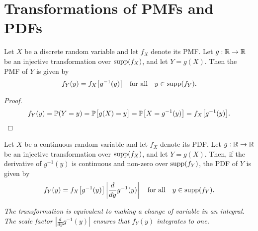 \section{Transformations of PMFs and PDFs}

\begin{theorem}\label{thm:transf_injective_discrete}
Let $X$ be a discrete random variable and let $f_X$ denote its PMF.  Let $g:\mathbb{R}\to\mathbb{R}$ be an injective transformation over $\text{supp}(f_X)$, and let $Y=g(X)$. Then the PMF of $Y$ is given by
\[
f_Y(y) = f_X\big[g^{-1}(y)\big] 
	\quad\text{for all}\quad y\in \supp(f_Y).%
\]
\end{theorem}

\begin{proof}
\[
f_Y(y)
	= \mathbb{P}(Y=y)
	= \mathbb{P}\big[g(X) = y\big]
	= \mathbb{P}\big[X = g^{-1}(y)\big]
	= f_X\big[g^{-1}(y)\big].
\]
\end{proof}	


\begin{theorem}\label{thm:transf_injective_continuous}
Let $X$ be a continuous random variable and let $f_X$ denote its PDF. Let $g:\mathbb{R}\to\mathbb{R}$ be an injective transformation over $\text{supp}(f_X)$, and let $Y=g(X)$. Then, if the derivative of $g^{-1}(y)$ is continuous and non-zero over $\text{supp}(f_Y)$, the PDF of $Y$ is given by
\[
f_Y(y) = f_X\big[g^{-1}(y)\big]\left|\frac{d}{dy}g^{-1}(y)\right| \quad\text{for all}\quad y\in \text{supp}(f_Y).
\]
\end{theorem}

\begin{remark}
\bit
\it The transformation is equivalent to making a \emph{change of variable} in an integral.
\it The scale factor $\displaystyle\left|\frac{d}{dy}g^{-1}(y)\right|$ ensures that $f_Y(y)$ integrates to one.
\eit
\end{remark}


